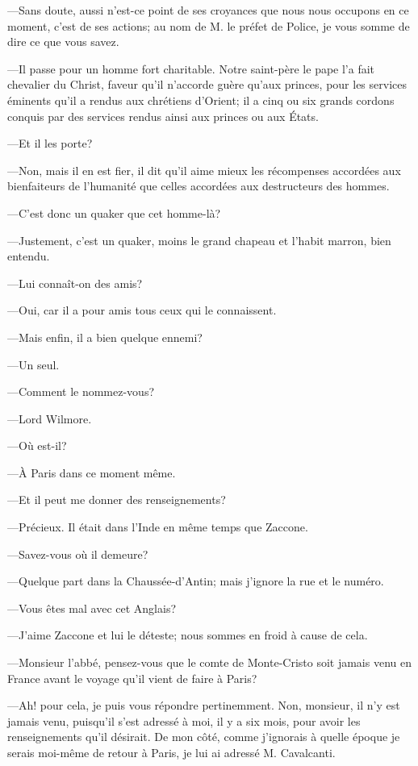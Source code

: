 —Sans doute, aussi n'est-ce point de ses croyances que nous nous occupons en ce moment, c'est de ses actions; au nom de M. le préfet de Police, je vous somme de dire ce que vous savez. 

—Il passe pour un homme fort charitable. Notre saint-père le pape l'a fait chevalier du Christ, faveur qu'il n'accorde guère qu'aux princes, pour les services éminents qu'il a rendus aux chrétiens d'Orient; il a cinq ou six grands cordons conquis par des services rendus ainsi aux princes ou aux États. 

—Et il les porte? 

—Non, mais il en est fier, il dit qu'il aime mieux les récompenses accordées aux bienfaiteurs de l'humanité que celles accordées aux destructeurs des hommes. 

—C'est donc un quaker que cet homme-là? 

—Justement, c'est un quaker, moins le grand chapeau et l'habit marron, bien entendu. 

—Lui connaît-on des amis? 

—Oui, car il a pour amis tous ceux qui le connaissent. 

—Mais enfin, il a bien quelque ennemi? 

—Un seul. 

—Comment le nommez-vous? 

—Lord Wilmore. 

—Où est-il? 

—À Paris dans ce moment même. 

—Et il peut me donner des renseignements? 

—Précieux. Il était dans l'Inde en même temps que Zaccone. 

—Savez-vous où il demeure? 

—Quelque part dans la Chaussée-d'Antin; mais j'ignore la rue et le numéro. 

—Vous êtes mal avec cet Anglais? 

—J'aime Zaccone et lui le déteste; nous sommes en froid à cause de cela. 

—Monsieur l'abbé, pensez-vous que le comte de Monte-Cristo soit jamais venu en France avant le voyage qu'il vient de faire à Paris? 

—Ah! pour cela, je puis vous répondre pertinemment. Non, monsieur, il n'y est jamais venu, puisqu'il s'est adressé à moi, il y a six mois, pour avoir les renseignements qu'il désirait. De mon côté, comme j'ignorais à quelle époque je serais moi-même de retour à Paris, je lui ai adressé M. Cavalcanti. 

